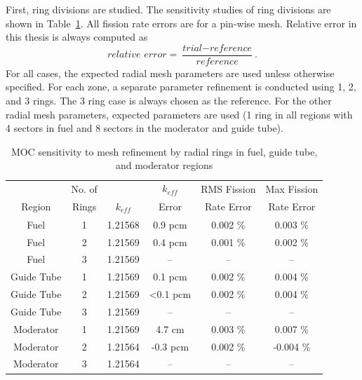 

First, ring divisions are studied. The sensitivity studies of ring divisions are shown in Table~\ref{tab:ring-sensitivity}. All fission rate errors are for a pin-wise mesh. Relative error in this thesis is always computed as
\begin{equation}
\textit{relative error} = \frac{\textit{trial} - \textit{reference}}{\textit{reference}}.
\end{equation}
For all cases, the expected radial mesh parameters are used unless otherwise specified. For each zone, a separate parameter refinement is conducted using 1, 2, and 3 rings. The 3 ring case is always chosen as the reference. For the other radial mesh parameters, expected parameters are used (1 ring in all regions with 4 sectors in fuel and 8 sectors in the moderator and guide tube).

\begin{table}[ht]
	\centering
	\caption{MOC sensitivity to mesh refinement by radial rings in fuel, guide tube, and moderator regions}
	\medskip
	\begin{tabular}{c|c|c|c|c|c}
		\hline
		 & No. of  & & $k_{\textit{eff}}$ & \ac{RMS} Fission & Max Fission \\
		Region  & Rings & $k_{\textit{eff}}$ & Error & Rate Error & Rate Error \\
		\hline
		Fuel & 1 & 1.21568 & 0.9 pcm  & 0.002 \% & 0.003 \% \\
		Fuel & 2 & 1.21569 & 0.4 pcm  & 0.001 \% & 0.002 \% \\
		Fuel & 3 & 1.21569 & -- & -- & -- \\
		\hline
		\hline
		Guide Tube & 1 & 1.21569 & 0.1 pcm & 0.002 \% & 0.004 \% \\
		Guide Tube & 2 & 1.21569 & <0.1 pcm  & 0.002 \% & 0.004 \% \\
		Guide Tube & 3 & 1.21569 & -- & -- & -- \\
		\hline
		\hline
		Moderator & 1 & 1.21569 & 4.7 cm  & 0.003 \% & 0.007 \% \\
		Moderator & 2 & 1.21564 & -0.3 pcm  & 0.002 \% & -0.004 \% \\
		Moderator & 3 & 1.21564 & -- & -- & -- \\
		\hline
	\end{tabular}
	\label{tab:ring-sensitivity}
\end{table}

